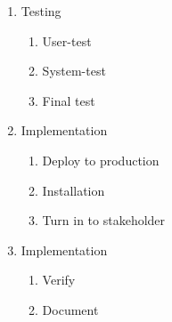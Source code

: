 \begin{mdframed}
\begin{enumerate}
\begin{enumerate}
        \item Testing
        \begin{enumerate}
            \item  User-test
            \item System-test  
            \item Final test
        \end{enumerate}

        \item Implementation
        \begin{enumerate}
            \item  Deploy to production
            \item Installation
            \item Turn in to stakeholder
        \end{enumerate}

        \item Implementation
        \begin{enumerate}
            \item Verify
            \item Document
        \end{enumerate}
    \end{enumerate}
    \end{enumerate}
\end{mdframed}
\endgroup

